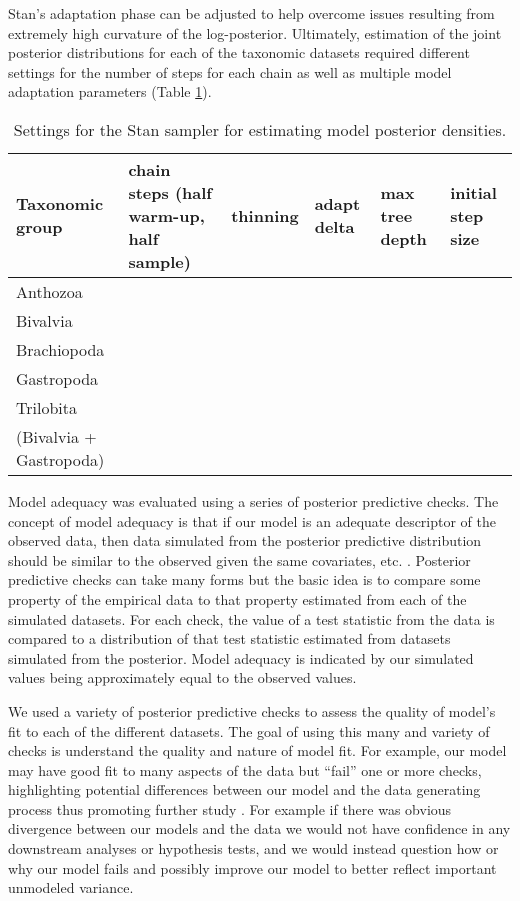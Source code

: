\documentclass[12pt,letterpaper]{article}
\begin{document}
Stan's adaptation phase can be adjusted to help overcome issues resulting from extremely high curvature of the log-posterior. Ultimately, estimation of the joint posterior distributions for each of the taxonomic datasets required different settings for the number of steps for each chain as well as multiple model adaptation parameters (Table \ref{tab:sampler}).

\begin{table}
  \centering
  \begin{tabular}{ l l l l l l }
    Taxonomic group & chain steps (half warm-up, half sample) & thinning & adapt delta & max tree depth & initial step size \\
    \hline
    Anthozoa & & & & & \\
    Bivalvia & & & & & \\
    Brachiopoda & & & & & \\
    Gastropoda & & & & & \\
    Trilobita & & & & & \\
    (Bivalvia + Gastropoda) & & & & & \\
  \end{tabular}
  \caption{Settings for the Stan sampler for estimating model posterior densities.}
  \label{tab:sampler}
\end{table}


Model adequacy was evaluated using a series of posterior predictive checks. The concept of model adequacy is that if our model is an adequate descriptor of the observed data, then data simulated from the posterior predictive distribution should be similar to the observed given the same covariates, etc. \citep{BDA3}. Posterior predictive checks can take many forms but the basic idea is to compare some property of the empirical data to that property estimated from each of the simulated datasets. For each check, the value of a test statistic from the data is compared to a distribution of that test statistic estimated from datasets simulated from the posterior. Model adequacy is indicated by our simulated values being approximately equal to the observed values.

We used a variety of posterior predictive checks to assess the quality of model's fit to each of the different datasets. The goal of using this many and variety of checks is understand the quality and nature of model fit. For example, our model may have good fit to many aspects of the data but ``fail'' one or more checks, highlighting potential differences between our model and the data generating process thus promoting further study \citep{ARM,BDA3}. For example if there was obvious divergence between our models and the data we would not have confidence in any downstream analyses or hypothesis tests, and we would instead question how or why our model fails and possibly improve our model to better reflect important unmodeled variance.
\end{document}
